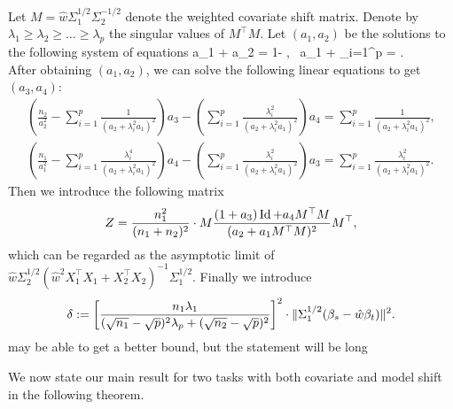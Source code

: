 Let ${M} = \hat{w} \Sigma_1^{1/2}\Sigma_2^{-1/2}$ denote the weighted covariate shift matrix. Denote by ${\lambda}_1\ge {\lambda}_2 \ge \dots \ge {\lambda}_p$ the singular values of ${M}^{\top}{M}$. Let $(a_1, a_2)$ be the solutions to the following system of equations
	\be
		 a_1 + a_2 = 1- ,~ a_1 + \sum_{i=1}^p  = .\label{eq_a2} \\
		 \ee
		 After obtaining $(a_1,a_2)$, we can solve the following linear equations to get $(a_3,a_4)$:
\begin{gather}
		\left(\frac{n_2}{a_2^2}- \sum_{i=1}^p \frac{1}{ (a_2 + \lambda_i^2a_1)^2  }\right) a_3 -  \left(\sum_{i=1}^p \frac{  \lambda_i^2 }{ (  a_2 + \lambda_i^2a_1)^2  }\right)a_4
		= \sum_{i=1}^p \frac{1 }{ (  a_2 + \lambda_i^2a_1)^2  }, \label{eq_a3} \\
		\left(\frac{n_1}{a_1^2} -  \sum_{i=1}^p \frac{\lambda_i^4   }{  (a_2 + \lambda_i^2a_1)^2  }\right)a_4 -\left(\sum_{i=1}^p \frac{\lambda_i^2  }{  (a_2 + \lambda_i^2a_1)^2  }\right)a_3
		= \sum_{i=1}^p \frac{\lambda_i^2 }{  (a_2 + \lambda_i^2a_1)^2  }. \label{eq_a4}
	\end{gather}
Then we introduce the following matrix
$$Z = \frac{n_1^2}{(n_1 + n_2)^2}\cdot{M} \frac{(1 + a_3)\operatorname{Id} + a_4 {M}^{\top}{M}}{(a_2 + a_1 {M}^{\top}{M})^2} {M}^{\top},$$
which can be regarded as the asymptotic limit of $\hat w \Sigma_2^{1/2} (\hat{w}^2 X_1^{\top}X_1 + X_2^{\top}X_2)^{-1}\Sigma_1^{1/2}$. Finally we introduce
$$\delta:=\left[\frac{n_1 \lambda_1}{(\sqrt{n_1}-\sqrt{p})^2\lambda_p  +  (\sqrt{n_2}-\sqrt{p})^2}\right]^2\cdot \|\Sigma_1^{1/2}(\beta_s - \hat{w}\beta_t)\|^2.$$
{\cor may be able to get a better bound, but the statement will be long}

We now state our main result for two tasks with both covariate and model shift in the following theorem.

